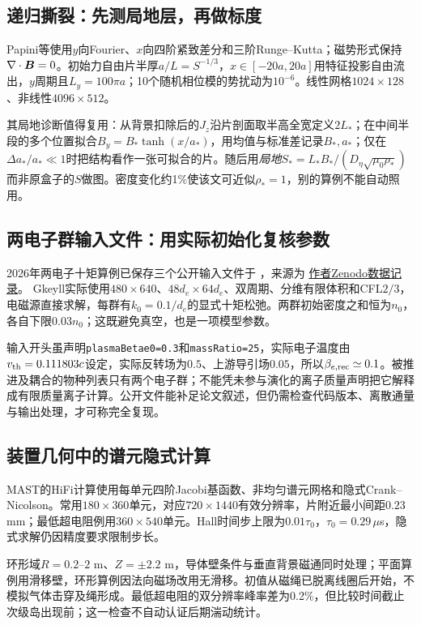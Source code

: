 \documentclass[UTF8,a4paper,11pt,openany,fontset=fandol]{ctexbook}
\begin{document}
\subsection{递归撕裂：先测局地层，再做标度}
Papini等使用$y$向Fourier、$x$向四阶紧致差分和三阶Runge--Kutta；磁势形式保持$\nabla\cdot\bm{B}=0$。初始力自由片半厚$a/L=S^{-1/3}$，$x\in[-20a,20a]$用特征投影自由流出，$y$周期且$L_y=100\pi a$；10个随机相位模的势扰动为$10^{-6}$。线性网格$1024\times128$、非线性$4096\times512$。

其局地诊断值得复用：从背景扣除后的$J_z$沿片剖面取半高全宽定义$2L_*$；在中间半段的多个位置拟合$B_y=B_*\tanh(x/a_*)$，用均值与标准差记录$B_*,a_*$；仅在$\Delta a_*/a_*\ll1$时把结构看作一张可拟合的片。随后用\emph{局地}$S_*=L_*B_*/(D_\eta\sqrt{\mu_0\rho_*})$而非原盒子的$S$做图。密度变化约1\%使该文可近似$\rho_*=1$，别的算例不能自动照用。\citep{L262}

\subsection{两电子群输入文件：用实际初始化复核参数}
2026年两电子十矩算例已保存三个公开输入文件于
，来源为
\href{https://doi.org/10.5281/zenodo.21114117}{作者Zenodo数据记录}。
Gkeyll实际使用$480\times640$、$48d_e\times64d_e$、双周期、分维有限体积和CFL$2/3$，电磁源直接求解，每群有$k_0=0.1/d_e$的显式十矩松弛。两群初始密度之和恒为$n_0$，各自下限$0.03n_0$；这既避免真空，也是一项模型参数。

输入开头虽声明\texttt{plasmaBetae0=0.3}和\texttt{massRatio=25}，实际电子温度由$v_{\rm th}=0.111803c$设定，实际反转场为$0.5$、上游导引场$0.05$，所以$\beta_{e,\rm rec}\simeq0.1$。被推进及耦合的物种列表只有两个电子群；不能凭未参与演化的离子质量声明把它解释成有限质量离子计算。公开文件能补足论文叙述，但仍需检查代码版本、离散通量与输出处理，才可称完全复现。\citep{F635}

\subsection{装置几何中的谱元隐式计算}
MAST的HiFi计算使用每单元四阶Jacobi基函数、非均匀谱元网格和隐式Crank--Nicolson。常用$180\times360$单元，对应$720\times1440$有效分辨率，片附近最小间距$0.23$ mm；最低超电阻例用$360\times540$单元。Hall时间步上限为$0.01\tau_0$，$\tau_0=0.29\,\mu$s，隐式求解仍因精度要求限制步长。

环形域$R=0.2$--$2$ m、$Z=\pm2.2$ m，导体壁条件与垂直背景磁通同时处理；平面算例用滑移壁，环形算例因法向磁场改用无滑移。初值从磁绳已脱离线圈后开始，不模拟气体击穿及绳形成。最低超电阻的双分辨率峰率差为0.2\%，但比较时间截止次级岛出现前；这一检查不自动认证后期湍动统计。\citep{Stanier2013}
\end{document}
